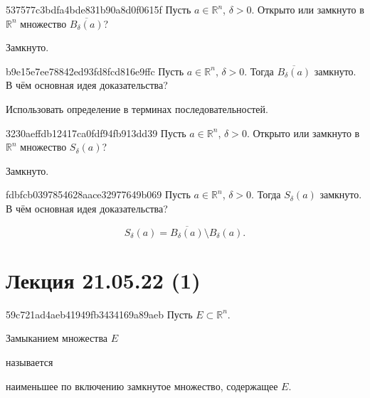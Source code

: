 \begin{note}{537577c3bdfa4bde831b90a8d0f0615f}
    Пусть \({ a \in \mathbb R^{n} }\),\: \({ \delta > 0 }\).
    Открыто или замкнуто в \({ \mathbb R^{n} }\) множество \({ \overline{B_\delta(a)} }\)?

    \begin{cloze}{1}
        Замкнуто.
    \end{cloze}
\end{note}

\begin{note}{b9e15e7ee78842ed93fd8fcd816e9ffc}
    Пусть \({ a \in \mathbb R^{n} }\),\: \({ \delta > 0 }\).
    Тогда \({ \overline{B_\delta(a)} }\) замкнуто.
    В чём основная идея доказательства?

    \begin{cloze}{1}
        Использовать определение в терминах последовательностей.
    \end{cloze}
\end{note}

\begin{note}{3230aeffdb12417ca0fdf94fb913dd39}
    Пусть \({ a \in \mathbb R^{n} }\),\: \({ \delta > 0 }\).
    Открыто или замкнуто в \({ \mathbb R^{n} }\) множество \({ S_\delta(a) }\)?

    \begin{cloze}{1}
        Замкнуто.
    \end{cloze}
\end{note}

\begin{note}{fdbfcb0397854628aace32977649b069}
    Пусть \({ a \in \mathbb R^{n} }\),\: \({ \delta > 0 }\).
    Тогда \({ S_\delta(a) }\) замкнуто.
    В чём основная идея доказательства?

    \begin{cloze}{1}
        \[
            S_\delta(a) = \overline{B_\delta(a)} \setminus B_\delta(a).
        \]
    \end{cloze}
\end{note}

\section{Лекция 21.05.22 (1)}
\begin{note}{59c721ad4aeb41949fb3434169a89aeb}
    Пусть \({ E \subset \mathbb R^{n} }\).
    \begin{icloze}{2}Замыканием множества \({ E }\)\end{icloze} называется \begin{icloze}{1}наименьшее по включению замкнутое множество, содержащее \({ E }\).\end{icloze}
\end{note}

